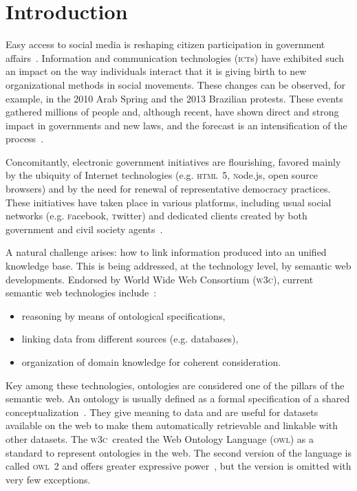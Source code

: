 \documentclass[10pt,letterpaper]{article}
\newcommand{\owl}{\textsc{owl}}
\newcommand{\ict}{\textsc{ict}}
\newcommand{\html}{\textsc{html}}
\newcommand{\node}{\textsc{n}ode.js}
\newcommand{\facebook}{\textsc{f}acebook}
\newcommand{\twitter}{\textsc{t}witter}
\newcommand{\wwwc}{\textsc{w3c}}
\begin{document}
\section{Introduction}\label{sec:into}
Easy access to social media is reshaping citizen participation in government affairs~\cite{socMed}. 
Information and communication technologies (\ict s) have exhibited such an impact on the way individuals interact
 that it is giving birth to new organizational methods in social movements. These changes can be observed, for example, in the 2010 Arab Spring and the 2013 Brazilian protests. These events gathered millions of people and, although recent, have shown direct and strong impact in governments and new laws, and the forecast is an intensification of the process~\cite{digRev1,digRev2,digRev3}.

Concomitantly, electronic government initiatives are flourishing, favored mainly by the ubiquity of Internet technologies (e.g. \html\ 5, \node, open source browsers) and by the need for renewal of representative democracy practices. 
These initiatives have taken place in various platforms, including usual social networks (e.g. \facebook, \twitter)
 and dedicated clients created by both government and civil society agents~\cite{socMed,pita2010arquitetura,barros2010alem,knowledge}.

A natural challenge arises: how to link information produced into an unified knowledge base. This is being addressed, at the technology level, by semantic web developments. Endorsed by World Wide Web Consortium (\wwwc), current semantic web technologies include~\cite{Sem1}:
\begin{itemize}
    \item reasoning by means of ontological specifications,
    \item linking data from different sources (e.g. databases),
    \item organization of domain knowledge for coherent consideration.
\end{itemize}

Key among these technologies, ontologies are considered one of the pillars of the semantic web. An ontology is usually defined as a formal specification of a shared conceptualization~\cite{gruber}.
They give meaning to data and are useful for datasets available on the web to make them automatically retrievable and linkable with other datasets. The \wwwc\ created the Web Ontology Language (\owl) as a standard to represent ontologies in the web.
The second version of the language is called \owl\ 2 and offers greater expressive power~\cite{owl2}, but the version is omitted with very few exceptions.
\end{document}
